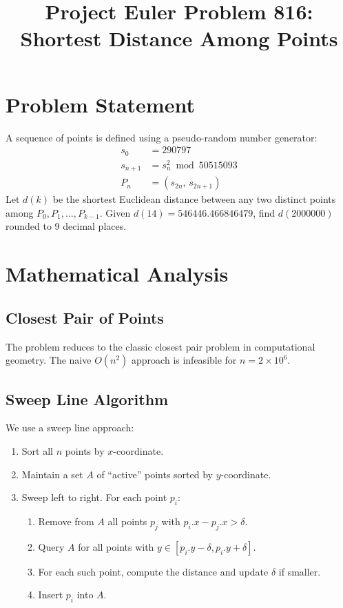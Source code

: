\documentclass[12pt]{article}
\title{Project Euler Problem 816:\\Shortest Distance Among Points}
\author{}
\date{}
\begin{document}
\maketitle

\section{Problem Statement}
A sequence of points is defined using a pseudo-random number generator:
\begin{align}
s_0 &= 290797 \\
s_{n+1} &= s_n^2 \bmod 50515093 \\
P_n &= (s_{2n},\, s_{2n+1})
\end{align}
Let $d(k)$ be the shortest Euclidean distance between any two distinct points among $P_0, P_1, \ldots, P_{k-1}$. Given $d(14) = 546446.466846479$, find $d(2000000)$ rounded to 9 decimal places.

\section{Mathematical Analysis}

\subsection{Closest Pair of Points}
The problem reduces to the classic closest pair problem in computational geometry. The naive $O(n^2)$ approach is infeasible for $n = 2\times 10^6$.

\subsection{Sweep Line Algorithm}
We use a sweep line approach:
\begin{enumerate}
    \item Sort all $n$ points by $x$-coordinate.
    \item Maintain a set $A$ of ``active'' points sorted by $y$-coordinate.
    \item Sweep left to right. For each point $p_i$:
    \begin{enumerate}
        \item Remove from $A$ all points $p_j$ with $p_i.x - p_j.x > \delta$.
        \item Query $A$ for all points with $y \in [p_i.y - \delta, p_i.y + \delta]$.
        \item For each such point, compute the distance and update $\delta$ if smaller.
        \item Insert $p_i$ into $A$.
    \end{enumerate}
\end{enumerate}
\end{document}
